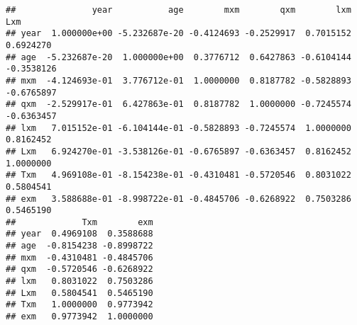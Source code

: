 \documentclass[
]{article}
\newenvironment{Shaded}{\begin{snugshade}}{\end{snugshade}}
\newcommand{\FunctionTok}[1]{\textcolor[rgb]{0.00,0.00,0.00}{#1}}
\newcommand{\NormalTok}[1]{#1}
\newcommand{\OtherTok}[1]{\textcolor[rgb]{0.56,0.35,0.01}{#1}}
\newcommand{\SpecialCharTok}[1]{\textcolor[rgb]{0.00,0.00,0.00}{#1}}
\newcommand{\StringTok}[1]{\textcolor[rgb]{0.31,0.60,0.02}{#1}}
\begin{document}
\begin{Shaded}
\end{Shaded}

\begin{verbatim}
##               year           age        mxm        qxm        lxm        Lxm
## year  1.000000e+00 -5.232687e-20 -0.4124693 -0.2529917  0.7015152  0.6924270
## age  -5.232687e-20  1.000000e+00  0.3776712  0.6427863 -0.6104144 -0.3538126
## mxm  -4.124693e-01  3.776712e-01  1.0000000  0.8187782 -0.5828893 -0.6765897
## qxm  -2.529917e-01  6.427863e-01  0.8187782  1.0000000 -0.7245574 -0.6363457
## lxm   7.015152e-01 -6.104144e-01 -0.5828893 -0.7245574  1.0000000  0.8162452
## Lxm   6.924270e-01 -3.538126e-01 -0.6765897 -0.6363457  0.8162452  1.0000000
## Txm   4.969108e-01 -8.154238e-01 -0.4310481 -0.5720546  0.8031022  0.5804541
## exm   3.588688e-01 -8.998722e-01 -0.4845706 -0.6268922  0.7503286  0.5465190
##             Txm        exm
## year  0.4969108  0.3588688
## age  -0.8154238 -0.8998722
## mxm  -0.4310481 -0.4845706
## qxm  -0.5720546 -0.6268922
## lxm   0.8031022  0.7503286
## Lxm   0.5804541  0.5465190
## Txm   1.0000000  0.9773942
## exm   0.9773942  1.0000000
\end{verbatim}
\end{document}
